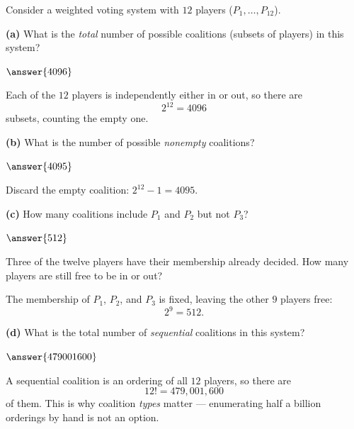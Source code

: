 \documentclass[12pt]{ximera}
\begin{document}
\begin{problem}
Consider a weighted voting system with $12$ players ($P_1,\ldots,P_{12}$).

\begin{prompt}
\textbf{(a)} What is the \emph{total} number of possible coalitions (subsets of
players) in this system?

$\answer{4096}$

\begin{feedback}
Each of the $12$ players is independently either in or out, so there are
\[ 2^{12} = 4096 \]
subsets, counting the empty one.
\end{feedback}
\end{prompt}

\begin{prompt}
\textbf{(b)} What is the number of possible \emph{nonempty} coalitions?

$\answer{4095}$

\begin{feedback}
Discard the empty coalition: $2^{12}-1 = 4095$.
\end{feedback}
\end{prompt}

\begin{prompt}
\textbf{(c)} How many coalitions include $P_1$ and $P_2$ but not $P_3$?

$\answer{512}$

\begin{hint}
Three of the twelve players have their membership already decided. How many players
are still free to be in or out?
\end{hint}

\begin{feedback}
The membership of $P_1$, $P_2$, and $P_3$ is fixed, leaving the other $9$ players free:
\[ 2^9 = 512. \]
\end{feedback}
\end{prompt}

\begin{prompt}
\textbf{(d)} What is the total number of \emph{sequential} coalitions in this system?

$\answer{479001600}$

\begin{feedback}
A sequential coalition is an ordering of all $12$ players, so there are
\[ 12! = 479{,}001{,}600 \]
of them. This is why coalition \emph{types} matter --- enumerating half a billion
orderings by hand is not an option.
\end{feedback}
\end{prompt}
\end{problem}
\end{document}
